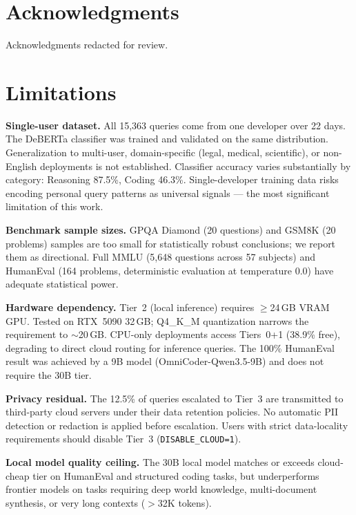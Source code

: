 \documentclass[11pt]{article}
\begin{document}
\section*{Acknowledgments}

Acknowledgments redacted for review.




\section*{Limitations}
\label{sec:limitations}

\textbf{Single-user dataset.} All 15,363 queries come from one developer
over 22 days. The DeBERTa classifier was trained and validated on the
same distribution. Generalization to multi-user, domain-specific
(legal, medical, scientific), or non-English deployments is not
established. Classifier accuracy varies substantially by category:
Reasoning 87.5\%, Coding 46.3\%. Single-developer training data risks
encoding personal query patterns as universal signals --- the most
significant limitation of this work.

\textbf{Benchmark sample sizes.} GPQA Diamond (20 questions) and GSM8K
(20 problems) samples are too small for statistically robust conclusions;
we report them as directional. Full MMLU (5,648 questions across 57
subjects) and HumanEval (164 problems, deterministic evaluation at
temperature 0.0) have adequate statistical power.

\textbf{Hardware dependency.} Tier~2 (local inference) requires
$\geq$24\,GB VRAM GPU. Tested on RTX~5090 32\,GB; Q4\_K\_M
quantization narrows the requirement to $\sim$20\,GB. CPU-only
deployments access Tiers~0+1 (38.9\% free), degrading to direct cloud
routing for inference queries. The 100\% HumanEval result was achieved
by a 9B model (OmniCoder-Qwen3.5-9B) and does not require the 30B tier.

\textbf{Privacy residual.} The 12.5\% of queries escalated to Tier~3
are transmitted to third-party cloud servers under their data retention
policies. No automatic PII detection or redaction is applied before
escalation. Users with strict data-locality requirements should disable
Tier~3 (\texttt{DISABLE\_CLOUD=1}).

\textbf{Local model quality ceiling.} The 30B local model matches or
exceeds cloud-cheap tier on HumanEval and structured coding tasks, but
underperforms frontier models on tasks requiring deep world knowledge,
multi-document synthesis, or very long contexts ($>$32K tokens).
\end{document}
